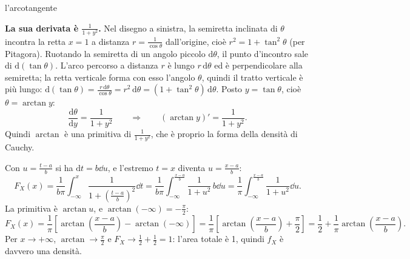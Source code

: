 \begin{richiamo}{l'arcotangente}
\begin{center}
\end{center}
\textbf{La sua derivata è $\frac{1}{1 + y^2}$.} Nel disegno a sinistra, la semiretta inclinata di $\theta$ incontra la
retta $x = 1$ a distanza $r = \frac{1}{\cos\theta}$ dall'origine, cioè $r^2 = 1 + \tan^2\theta$ (per Pitagora). Ruotando
la semiretta di un angolo piccolo $\mathrm{d}\theta$, il punto d'incontro sale di $\mathrm{d}(\tan\theta)$. L'arco
percorso a distanza $r$ è lungo $r\,\mathrm{d}\theta$ ed è perpendicolare alla semiretta; la retta verticale forma con
esso l'angolo $\theta$, quindi il tratto verticale è più lungo: $\mathrm{d}(\tan\theta) = \frac{r\,\mathrm{d}\theta}{\cos\theta}
= r^2\,\mathrm{d}\theta = (1 + \tan^2\theta)\,\mathrm{d}\theta$. Posto $y = \tan\theta$, cioè $\theta = \arctan y$:
\[ \frac{\mathrm{d}\theta}{\mathrm{d}y} = \frac{1}{1 + y^2} \qquad\Longrightarrow\qquad (\arctan y)' = \frac{1}{1 + y^2} . \]
Quindi $\arctan$ è una primitiva di $\frac{1}{1 + y^2}$, che è proprio la forma della densità di Cauchy.
\end{richiamo}


\begin{dimostrazione}
 Con $u = \frac{t - a}{b}$ si ha $\mathrm{d}t = b \dd u$, e l'estremo $t = x$ diventa
$u = \frac{x - a}{b}$:
\[ F_X(x) = \frac{1}{b\pi} \int_{-\infty}^{x} \frac{1}{1 + \left( \frac{t - a}{b} \right)^2} \dd t =
   \frac{1}{b\pi} \int_{-\infty}^{\frac{x - a}{b}} \frac{1}{1 + u^2}\, b \dd u = \frac{1}{\pi}
   \int_{-\infty}^{\frac{x - a}{b}} \frac{1}{1 + u^2} \dd u . \]
 La primitiva è $\arctan u$, e $\arctan(-\infty) = -\frac{\pi}{2}$:
\[ F_X(x) = \frac{1}{\pi} \left[ \arctan\left( \frac{x - a}{b} \right) - \arctan(-\infty) \right] = \frac{1}{\pi}
   \left[ \arctan\left( \frac{x - a}{b} \right) + \frac{\pi}{2} \right] = \frac12 + \frac{1}{\pi} \arctan\left(
   \frac{x - a}{b} \right) . \]
 Per $x \to +\infty$, $\arctan \to \frac{\pi}{2}$ e $F_X \to \frac12 + \frac12 = 1$: l'area totale è
1, quindi $f_X$ è davvero una densità.
\end{dimostrazione}

